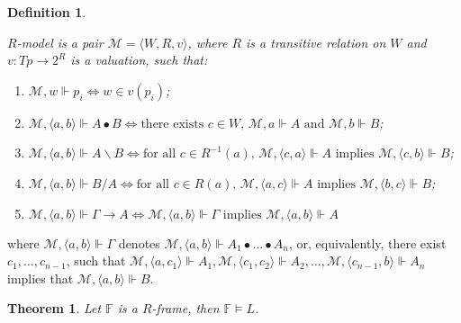 \documentclass[a4paper]{article}
\theoremstyle{defin}
\newtheorem{defin}{Definition}
\theoremstyle{theorem}
\newtheorem{theorem}{Theorem}
\theoremstyle{prop}
\theoremstyle{lemma}
\theoremstyle{ex}
\theoremstyle{col}
\begin{document}
\begin{defin}
  $ $

  $R$-model is a pair $\mathcal{M} = \langle W, R, v \rangle$,
  where $R$ is a transitive relation on $W$ and $v : Tp \to 2^R$ is a valuation, such that:

  \begin{enumerate}
    \item $\mathcal{M}, w \Vdash p_i \Leftrightarrow w \in v(p_i)$;
    \item $\mathcal{M}, \langle a, b \rangle \Vdash A \bullet B \Leftrightarrow
      \text{there exists $c \in W$, $\mathcal{M}, a \Vdash A$ and $\mathcal{M}, b \Vdash B$}$;
    \item $\mathcal{M}, \langle a, b \rangle \Vdash A \backslash B \Leftrightarrow
      \text{for all $c \in R^{-1}(a)$, $\mathcal{M}, \langle c, a \rangle \Vdash A$ implies
      $\mathcal{M}, \langle c, b \rangle \Vdash B$}$;
    \item $\mathcal{M}, \langle a, b \rangle \Vdash B / A \Leftrightarrow
        \text{for all $c \in R(a)$, $\mathcal{M}, \langle a, c \rangle \Vdash A$ implies
        $\mathcal{M}, \langle b, c \rangle \Vdash B$}$;
    \item $\mathcal{M}, \langle a, b \rangle \Vdash \Gamma \rightarrow A \Leftrightarrow
    \mathcal{M}, \langle a, b \rangle \Vdash \Gamma \text{ implies } \mathcal{M}, \langle a, b \rangle \Vdash A$
  \end{enumerate}
\end{defin}

where $\mathcal{M}, \langle a, b \rangle \Vdash \Gamma$ denotes $\mathcal{M}, \langle a, b \rangle \Vdash A_1 \bullet \dots \bullet A_n$, or,
equivalently, there exist $c_1, \dots, c_{n-1}$,
such that $\mathcal{M}, \langle a, c_1 \rangle \Vdash A_1,
\mathcal{M}, \langle c_1, c_2 \rangle \Vdash A_2, \dots,
\mathcal{M}, \langle c_{n-1}, b \rangle \Vdash A_n$ implies that $\mathcal{M}, \langle a, b \rangle \Vdash B$.

\begin{theorem}
  Let $\mathbb{F}$ is a $R$-frame, then $\mathbb{F} \models L$.
\end{theorem}
\end{document}
